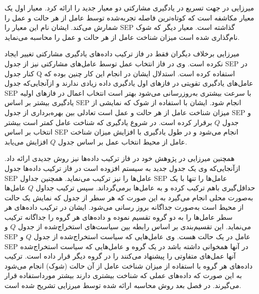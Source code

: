 
میرزایی در  جهت تسریع در یادگیری مشارکتی دو معیار جدید را ارائه کرد. معیار اول یک معیار مکاشفه است که کوتاه‌ترین فاصله تجربه‌شده توسط عامل از هر حالت و عمل را شمارش می‌کند. ایشان نام این معیار را SEP گذاشته است. معیار دیگر که شوک نام‌گذاری شده است میزان شناخت عامل از هر حالت و عمل را محاسبه می‌نماید.

میرزایی برخلاف دیگران فقط در فاز ترکیب داده‌های یادگیری مشارکتی تغییر ایجاد نکرده است. وی در فاز انتخاب عمل توسط عامل‌های مشارکتی نیز از جدول SEP در کنار جدول Q استفاده کرده است. استدلال ایشان در انجام این کار چنین بوده که عامل‌های یادگیری تقویتی در فازهای اول یادگیری داده زیادی ندارند و ازآنجایی‌که جدول SEP با سرعت بیشتری به‌روزرسانی می‌شود بهتر است انتخاب اعمال در فازهای اولیه یادگیری بیشتر بر اساس SEP انجام شود. ایشان با استفاده از شوک که نمایشی از میزان شناخت عامل از هر حالت و عمل است تعادلی بین بهره‌برداری از جدول SEP و جدول $Q$ برقرار کرده است. در شروع یادگیری که شناخت عامل کمتر است بیشتر انتخاب بر اساس SEP انجام می‌شود و در طول یادگیری با افزایش میزان شناخت عامل از محیط انتخاب عمل بر اساس جدول $Q$ افزایش می‌یابد.

 همچنین میرزایی در پژوهش خود در فاز ترکیب داده‌ها نیز روش جدیدی ارائه داد. ازآنجایی‌که وی یک جدول جدید به سیستم افزوده است در فاز ترکیب داده‌ها جدول SEP عامل‌ها را نیز ترکیب می‌نماید. همچنین جداول SEP عامل‌ها را تنها با یک حداقل‌گیری باهم ترکیب کرده و به عامل‌ها برمی‌گرداند. سپس ترکیب جداول $Q$ عامل‌ها به‌صورت محلی انجام می‌گیرد به این صورت که هر سطر از جدول که نمایش یک حالت از محیط است به‌صورت جداگانه بروز رسانی می‌شود. ایشان در ترکیب داده‌های هر سطر عامل‌ها را به دو گروه تقسیم نموده و داده‌های هر گروه را جداگانه ترکیب می‌نماید. این تقسیم‌بندی بر اساس رابطه بین سیاست‌های استخراج‌شده از جدول $Q$ و SEP عامل در یک حالت هست. وی عامل‌هایی که سیاست استخراج‌شده از جدول $Q$ و SEP در آنها همخوانی داشته باشد در یک گروه و عامل‌هایی که سیاست استخراج‌شده آنها عمل‌های متفاوتی را پیشنهاد می‌کنند را در گروه دیگر قرار داده است. ترکیب داده‌های هر گروه با استفاده از میزان شناخت عامل از آن حالت (شوک) انجام می‌شود به این صورت که داده‌های عملی که شناخت بیشتری دارند بیشتر مورداستفاده قرار می‌گیرند. در فصل بعد روش محاسبه ارائه شده توسط میرزایی تشریح شده است.
